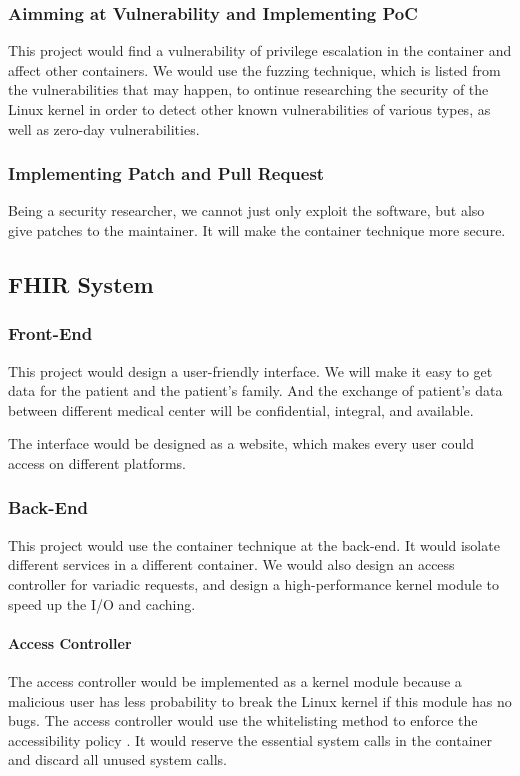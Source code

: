 \documentclass[12pt,a4paper]{article}
\begin{document}
\subsubsection{Aimming at Vulnerability and Implementing PoC}
This project would find a vulnerability of privilege escalation in the container and affect
other containers. We would use the fuzzing technique, which is listed from the vulnerabilities
that may happen, to ontinue researching the security of the Linux kernel in order to detect
other known vulnerabilities of various types, as well as zero-day vulnerabilities. \cite{Fuzzing}

\subsubsection{Implementing Patch and Pull Request}
Being a security researcher, we cannot just only exploit the software, but also give patches to
the maintainer. It will make the container technique more secure.

\subsection{FHIR System}
\subsubsection{Front-End}
This project would design a user-friendly interface. We will make it easy to get data for the
patient and the patient's family. And the exchange of patient's data between different
medical center will be confidential, integral, and available.

The interface would be designed as a website, which makes every user could access on different
platforms.

\subsubsection{Back-End}
This project would use the container technique at the back-end. It would isolate different
services in a different container. We would also design an access controller for variadic
requests, and design a high-performance kernel module to speed up the I/O and caching.

\paragraph{Access Controller}
The access controller would be implemented as a kernel module because a malicious user has
less probability to break the Linux kernel if this module has no bugs.
The access controller would use the whitelisting method to enforce the accessibility policy
\cite{Access_Control_Architecture}.
It would reserve the essential system calls in the container and discard all unused system calls.
\end{document}
